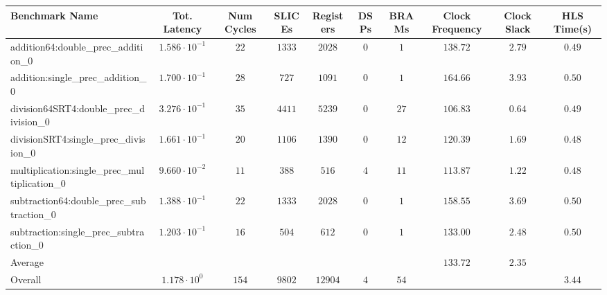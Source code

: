 \begin{tabular}{|l|c|c|c|c|c|c|c|c|c|}
\hline
Benchmark Name                                 & Tot. Latency            & Num Cycles & SLICEs   & Registers & DSPs  & BRAMs  & Clock Frequency & Clock Slack & HLS Time(s) \\
\hline
addition64:double\_prec\_addition\_0           & $ 1.586 \cdot 10^{-1} $ & $ 22     $ & $ 1333 $ & $ 2028  $ & $ 0 $ & $ 1  $ & $ 138.72      $ & $ 2.79    $ & $ 0.49    $ \\
addition:single\_prec\_addition\_0             & $ 1.700 \cdot 10^{-1} $ & $ 28     $ & $ 727  $ & $ 1091  $ & $ 0 $ & $ 1  $ & $ 164.66      $ & $ 3.93    $ & $ 0.50    $ \\
division64SRT4:double\_prec\_division\_0       & $ 3.276 \cdot 10^{-1} $ & $ 35     $ & $ 4411 $ & $ 5239  $ & $ 0 $ & $ 27 $ & $ 106.83      $ & $ 0.64    $ & $ 0.49    $ \\
divisionSRT4:single\_prec\_division\_0         & $ 1.661 \cdot 10^{-1} $ & $ 20     $ & $ 1106 $ & $ 1390  $ & $ 0 $ & $ 12 $ & $ 120.39      $ & $ 1.69    $ & $ 0.48    $ \\
multiplication:single\_prec\_multiplication\_0 & $ 9.660 \cdot 10^{-2} $ & $ 11     $ & $ 388  $ & $ 516   $ & $ 4 $ & $ 11 $ & $ 113.87      $ & $ 1.22    $ & $ 0.48    $ \\
subtraction64:double\_prec\_subtraction\_0     & $ 1.388 \cdot 10^{-1} $ & $ 22     $ & $ 1333 $ & $ 2028  $ & $ 0 $ & $ 1  $ & $ 158.55      $ & $ 3.69    $ & $ 0.50    $ \\
subtraction:single\_prec\_subtraction\_0       & $ 1.203 \cdot 10^{-1} $ & $ 16     $ & $ 504  $ & $ 612   $ & $ 0 $ & $ 1  $ & $ 133.00      $ & $ 2.48    $ & $ 0.50    $ \\
\hline
Average                                        & $                     $ & $        $ & $      $ & $       $ & $   $ & $    $ & $ 133.72      $ & $ 2.35    $ & $         $ \\
\hline
Overall                                        & $ 1.178 \cdot 10^{0}  $ & $ 154    $ & $ 9802 $ & $ 12904 $ & $ 4 $ & $ 54 $ & $             $ & $         $ & $ 3.44    $ \\
\hline
\end{tabular}
